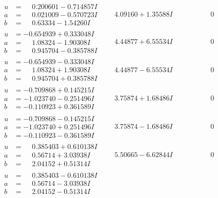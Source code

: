 \documentclass[1p]{elsarticle_modified}
\theoremstyle{definition}
\begin{document}
$$\begin{array}{c|c|c}
\begin{aligned}
u &= \phantom{-}0.200601 - 0.714857 I \\
a &= \phantom{-}0.021009 - 0.570723 I \\
b &= \phantom{-}0.63334 - 1.54260 I\end{aligned}
 & \phantom{-}4.09160 + 1.35588 I & \phantom{-0.000000 } 0 \\ \hline\begin{aligned}
u &= -0.654939 + 0.333048 I \\
a &= \phantom{-}1.08324 - 1.90308 I \\
b &= \phantom{-}0.945704 - 0.385788 I\end{aligned}
 & \phantom{-}4.44877 + 6.55534 I & \phantom{-0.000000 } 0 \\ \hline\begin{aligned}
u &= -0.654939 - 0.333048 I \\
a &= \phantom{-}1.08324 + 1.90308 I \\
b &= \phantom{-}0.945704 + 0.385788 I\end{aligned}
 & \phantom{-}4.44877 - 6.55534 I & \phantom{-0.000000 } 0 \\ \hline\begin{aligned}
u &= -0.709868 + 0.145215 I \\
a &= -1.023740 - 0.251496 I \\
b &= -0.110923 + 0.361589 I\end{aligned}
 & \phantom{-}3.75874 + 1.68486 I & \phantom{-0.000000 } 0 \\ \hline\begin{aligned}
u &= -0.709868 - 0.145215 I \\
a &= -1.023740 + 0.251496 I \\
b &= -0.110923 - 0.361589 I\end{aligned}
 & \phantom{-}3.75874 - 1.68486 I & \phantom{-0.000000 } 0 \\ \hline\begin{aligned}
u &= \phantom{-}0.385403 + 0.610138 I \\
a &= \phantom{-}0.56714 + 3.03938 I \\
b &= \phantom{-}2.04152 + 0.51314 I\end{aligned}
 & \phantom{-}5.50665 - 6.62844 I & \phantom{-0.000000 } 0 \\ \hline\begin{aligned}
u &= \phantom{-}0.385403 - 0.610138 I \\
a &= \phantom{-}0.56714 - 3.03938 I \\
b &= \phantom{-}2.04152 - 0.51314 I\end{aligned}

\end{array}$$
\end{document}
